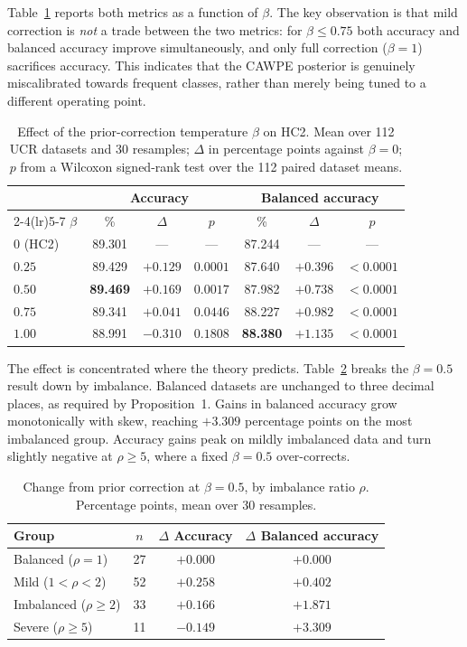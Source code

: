 Table~\ref{tab:beta} reports both metrics as a function of $\beta$. The key observation
is that mild correction is \emph{not} a trade between the two metrics: for
$\beta \leq 0.75$ both accuracy and balanced accuracy improve simultaneously, and only
full correction ($\beta=1$) sacrifices accuracy. This indicates that the CAWPE posterior
is genuinely miscalibrated towards frequent classes, rather than merely being tuned to a
different operating point.

\begin{table}[t]
\centering
\caption{Effect of the prior-correction temperature $\beta$ on HC2. Mean over 112 UCR
datasets and 30 resamples; $\Delta$ in percentage points against $\beta=0$; $p$ from a
Wilcoxon signed-rank test over the 112 paired dataset means.}
\label{tab:beta}
\begin{tabular}{lcccccc}
\toprule
& \multicolumn{3}{c}{Accuracy} & \multicolumn{3}{c}{Balanced accuracy} \\
\cmidrule(lr){2-4}\cmidrule(lr){5-7}
$\beta$ & \% & $\Delta$ & $p$ & \% & $\Delta$ & $p$ \\
\midrule
$0$ (HC2)      & 89.301 & --- & --- & 87.244 & --- & --- \\
$0.25$         & 89.429 & $+0.129$ & $0.0001$ & 87.640 & $+0.396$ & $<0.0001$ \\
$\mathbf{0.50}$& \textbf{89.469} & $\mathbf{+0.169}$ & $\mathbf{0.0017}$ & 87.982 & $+0.738$ & $<0.0001$ \\
$0.75$         & 89.341 & $+0.041$ & $0.0446$ & 88.227 & $+0.982$ & $<0.0001$ \\
$1.00$         & 88.991 & $-0.310$ & $0.1808$ & \textbf{88.380} & $\mathbf{+1.135}$ & $<0.0001$ \\
\bottomrule
\end{tabular}
\end{table}

The effect is concentrated where the theory predicts. Table~\ref{tab:groups} breaks the
$\beta=0.5$ result down by imbalance. Balanced datasets are unchanged to three decimal
places, as required by Proposition~1. Gains in balanced accuracy grow monotonically with
skew, reaching $+3.309$ percentage points on the most imbalanced group. Accuracy gains
peak on mildly imbalanced data and turn slightly negative at $\rho \geq 5$, where a fixed
$\beta = 0.5$ over-corrects.

\begin{table}[t]
\centering
\caption{Change from prior correction at $\beta=0.5$, by imbalance ratio $\rho$.
Percentage points, mean over 30 resamples.}
\label{tab:groups}
\begin{tabular}{lccc}
\toprule
Group & $n$ & $\Delta$ Accuracy & $\Delta$ Balanced accuracy \\
\midrule
Balanced ($\rho=1$)      & 27 & $+0.000$ & $+0.000$ \\
Mild ($1<\rho<2$)        & 52 & $+0.258$ & $+0.402$ \\
Imbalanced ($\rho\geq2$) & 33 & $+0.166$ & $+1.871$ \\
Severe ($\rho\geq5$)     & 11 & $-0.149$ & $+3.309$ \\
\bottomrule
\end{tabular}
\end{table}

